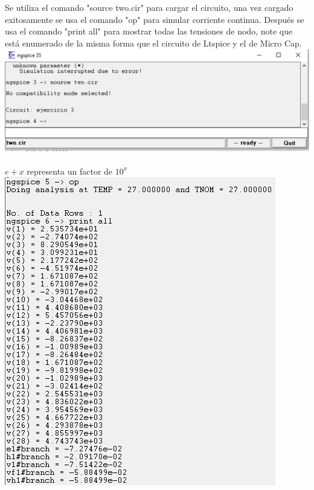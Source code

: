 \documentclass{article}
\begin{document}
Se utiliza el comando "source two.cir" para cargar el circuito, una vez cargado exitosamente se usa el comando "op" para simular corriente continua. Después se usa el comando "print all" para mostrar todas las tensiones de nodo, note que está enumerado de la misma forma que el circuito de Ltspice y el de Micro Cap.\\
\includegraphics[]{images/ngspice1_70.PNG}\\ \\
$e+x$ representa un factor de $10^x$ \\  
\includegraphics[]{images/ngspice2.PNG}\\ \\
\end{document}
